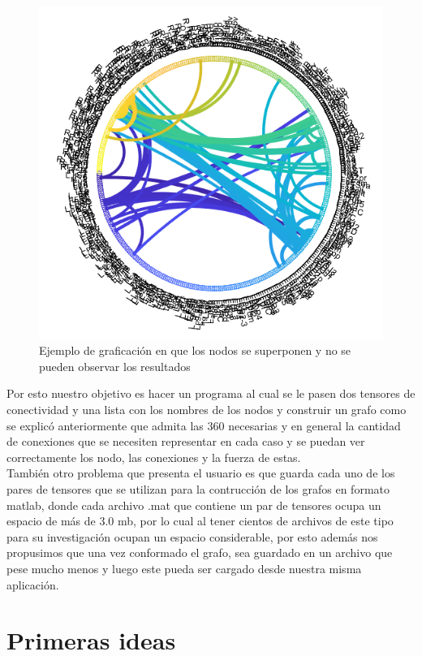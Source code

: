 \documentclass[a4paper,10pt,twocolumn]{article}
\begin{document}
\begin{figure}[h!]%
\center
\includegraphics[scale=0.3]{example2.png}
\caption{Ejemplo de graficación en que los nodos se superponen y no se pueden observar los resultados}
\end{figure}
 
 
Por esto nuestro objetivo es hacer un programa al cual se le pasen dos tensores de conectividad y una lista con los nombres de los nodos y construir un grafo como se explicó anteriormente que admita las 360 necesarias y en general la cantidad de conexiones que se necesiten representar en cada caso y se puedan ver correctamente los nodo, las conexiones y la fuerza de estas. \\

También otro problema que presenta el usuario es que guarda cada uno de los pares de tensores que se utilizan para la contrucción de los grafos en formato matlab, donde cada archivo .mat que contiene un par de tensores ocupa un espacio de más de 3.0 mb, por lo cual al tener cientos de archivos de este tipo para su investigación ocupan un espacio considerable, por esto además nos propusimos que una vez conformado el grafo, sea guardado en un archivo que pese mucho menos y luego este pueda ser cargado desde nuestra misma aplicación. 

\section*{Primeras ideas}
\end{document}
